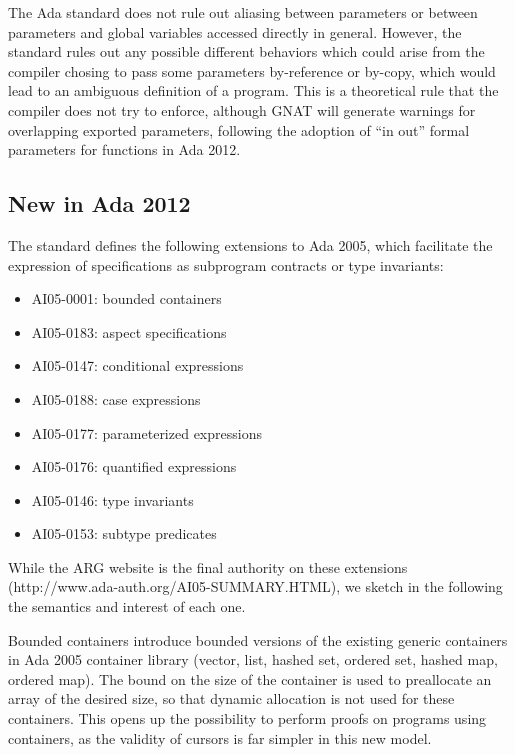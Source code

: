 \documentclass[fullpage]{article}
\begin{document}
The Ada standard does not rule out aliasing between parameters or between
parameters and global variables accessed directly in general. However, the
standard rules out any possible different behaviors which could arise from the
compiler chosing to pass some parameters by-reference or by-copy, which would
lead to an ambiguous definition of a program. This is a theoretical rule that
the compiler does not try to enforce, although GNAT will generate warnings for
overlapping exported parameters, following the adoption of ``in out'' formal
parameters for functions in Ada 2012.

\subsection{New in Ada 2012}

The standard defines the following extensions to Ada 2005, which facilitate the
expression of specifications as subprogram contracts or type invariants:

\begin{itemize}
\item AI05-0001: bounded containers
\item AI05-0183: aspect specifications
\item AI05-0147: conditional expressions
\item AI05-0188: case expressions
\item AI05-0177: parameterized expressions
\item AI05-0176: quantified expressions
\item AI05-0146: type invariants
\item AI05-0153: subtype predicates
\end{itemize}

While the ARG website is the final authority on these extensions
(http://www.ada-auth.org/AI05-SUMMARY.HTML), we sketch in the following the
semantics and interest of each one.

Bounded containers introduce bounded versions of the existing generic
containers in Ada 2005 container library (vector, list, hashed set, ordered
set, hashed map, ordered map). The bound on the size of the container is used
to preallocate an array of the desired size, so that dynamic allocation is not
used for these containers. This opens up the possibility to perform proofs on
programs using containers, as the validity of cursors is far simpler in this
new model.
\end{document}
